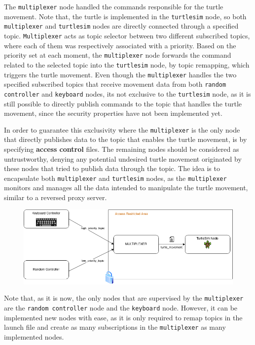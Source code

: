 The \texttt{multiplexer} node handled the commands responsible for the turtle movement. Note that, the turtle is implemented in the \texttt{turtlesim} node, so both \texttt{multiplexer} and \texttt{turtlesim} nodes are directly connected through a specified topic. \texttt{Multiplexer} acts as topic selector between two different subscribed topics, where each of them was respectively associated with a priority. Based on the priority set at each moment, the \texttt{multiplexer} node forwards the command related to the selected topic into the \texttt{turtlesim} node, by topic remapping, which triggers the turtle movement. Even though the \texttt{multiplexer} handles the two specified subscribed topics that receive movement data from both \texttt{random controller} and \texttt{keyboard} nodes, its not exclusive to the \texttt{turtlesim} node, as it is still possible to directly publish commands to the topic that handles the turtle movement, since the security properties have not been implemented yet.

In order to guarantee this exclusivity where the \texttt{multiplexer} is the only node that directly publishes data to the topic that enables the turtle movement, is by specifying \textbf{access control} files. The remaining nodes should be considered as untrustworthy, denying any potential undesired turtle movement originated by these nodes that tried to publish data through the topic. The idea is to encapsulate both \texttt{multiplexer} and \texttt{turtlesim} nodes, as the \texttt{multiplexer} monitors and manages all the data intended to manipulate the turtle movement, similar to a reversed proxy server.

\begin{figure}[H]
    \centering
    \includegraphics[width=0.8\linewidth]{images/ts_secured_multiplexer.png}
\end{figure}

Note that, as it is now, the only nodes that are supervised by the \texttt{multiplexer} are the \texttt{random controller} node and the \texttt{keyboard} node. However, it can be implemented new nodes with ease, as it is only required to remap topics in the launch file and create as many subscriptions in the \texttt{multiplexer} as many implemented nodes.

